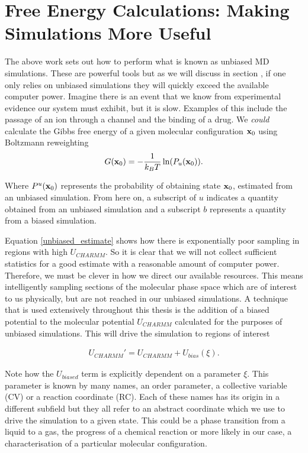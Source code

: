\section{Free Energy Calculations: Making Simulations More Useful}
The above work sets out how to perform what is known as unbiased MD simulations. These are powerful tools but as we will discuss in section , if one only relies on unbiased simulations they will quickly exceed the available computer power. Imagine there is an event that we know from experimental evidence our system must exhibit, but it is slow. Examples of this include the passage of an ion through a channel and the binding of a drug. We \textit{could} calculate the Gibbs free energy of a given molecular configuration $\bold{x}_0$ using Boltzmann reweighting 
\begin{equation}
	G (\bold{x}_0) = -\frac{1}{k_BT}\ln(P_{u}(\bold{x}_0)).
	\label{unbiased_estimate}
\end{equation}

Where $P^u(\bold{x}_0)$ represents the probability of obtaining state $\bold{x}_0$, estimated from an unbiased simulation. From here on, a subscript of $u$ indicates a quantity obtained from an unbiased simulation and a subscript $b$ represents a quantity from a biased simulation. 

Equation \ref{unbiased_estimate} shows how there is exponentially poor sampling in regions with high $U_{CHARMM}$. So it is clear that we will not collect sufficient statistics for a good estimate with a reasonable amount of computer power. Therefore, we must be clever in how we direct our available resources. This means intelligently sampling sections of the molecular phase space which are of interest to us physically, but are not reached in our unbiased simulations. A technique that is used extensively throughout this thesis is the addition of a biased potential to the molecular potential $U_{CHARMM}$ calculated for the purposes of unbiased simulations. This will drive the simulation to regions of interest

\begin{equation}
\begin{aligned}
U_{CHARMM}'  = U_{CHARMM} + U_{bias} (\xi).
\end{aligned}
\end{equation}

Note how the $U_{biased}$ term is explicitly dependent on a parameter $\xi$. This parameter is known by many names, an order parameter, a collective variable (CV) or a reaction coordinate (RC). Each of these names has its origin in a different subfield but they all refer to an abstract coordinate which we use to drive the simulation to a given state. This could be a phase transition from a liquid to a gas, the progress of a chemical reaction or more likely in our case, a characterisation of a particular molecular configuration. 

